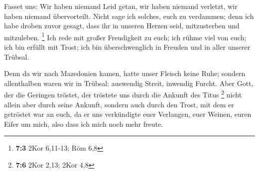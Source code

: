  Fasset uns: Wir haben niemand Leid getan, wir haben
niemand verletzt, wir haben niemand übervorteilt.  Nicht
sage ich solches, euch zu verdammen; denn ich habe droben zuvor gesagt,
dass ihr in unseren Herzen seid, mitzusterben und mitzuleben.
\footnote{\textbf{7:3} 2Kor 6,11-13; Röm 6,8}  Ich rede
mit großer Freudigkeit zu euch; ich rühme viel von euch; ich bin erfüllt
mit Trost; ich bin überschwenglich in Freuden und in aller unserer
Trübsal.

 Denn da wir nach Mazedonien kamen, hatte unser Fleisch
keine Ruhe; sondern allenthalben waren wir in Trübsal: auswendig Streit,
inwendig Furcht.  Aber Gott, der die Geringen tröstet, der
tröstete uns durch die Ankunft des Titus \footnote{\textbf{7:6} 2Kor
  2,13; 2Kor 4,8}  nicht allein aber durch seine Ankunft,
sondern auch durch den Trost, mit dem er getröstet war an euch, da er
uns verkündigte euer Verlangen, euer Weinen, euren Eifer um mich, also
dass ich mich noch mehr freute.

